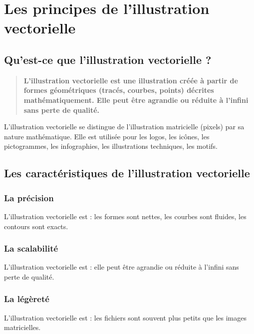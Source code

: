 \section{Les principes de l'illustration vectorielle}

\subsection{Qu'est-ce que l'illustration vectorielle ?}

\begin{quote}
\textbf{L'illustration vectorielle est une illustration créée à partir de formes géométriques (tracés, courbes, points) décrites mathématiquement. Elle peut être agrandie ou réduite à l'infini sans perte de qualité.}
\end{quote}

L'illustration vectorielle se distingue de l'illustration matricielle (pixels) par sa nature mathématique. Elle est utilisée pour les logos, les icônes, les pictogrammes, les infographies, les illustrations techniques, les motifs.

\subsection{Les caractéristiques de l'illustration vectorielle}

\subsubsection{La précision}

L'illustration vectorielle est  : les formes sont nettes, les courbes sont fluides, les contours sont exacts.

\subsubsection{La scalabilité}

L'illustration vectorielle est  : elle peut être agrandie ou réduite à l'infini sans perte de qualité.

\subsubsection{La légèreté}

L'illustration vectorielle est  : les fichiers sont souvent plus petits que les images matricielles.

